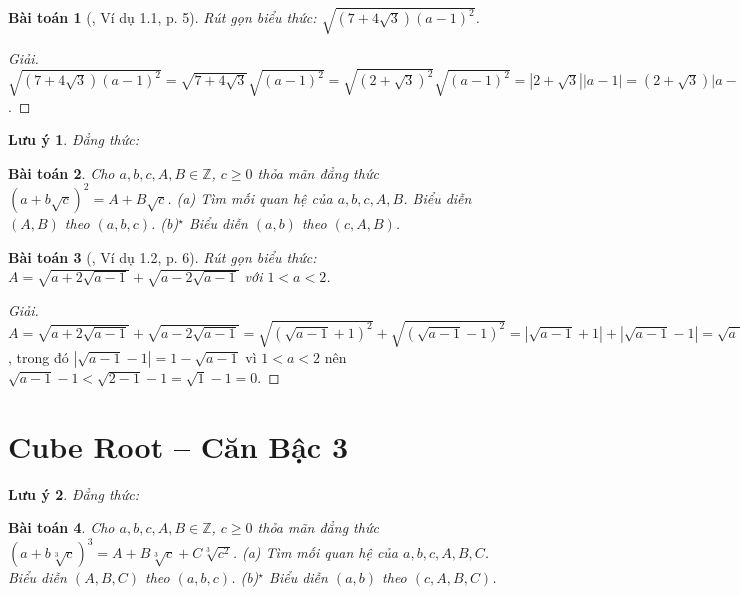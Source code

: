 \documentclass{article}
\newtheorem{baitoan}{Bài toán}
\newtheorem{luuy}{Lưu ý}
\begin{document}
\begin{baitoan}[\cite{TLCT_THCS_Toan_9_dai_so}, Ví dụ 1.1, p. 5]
	Rút gọn biểu thức: $\sqrt{(7 + 4\sqrt{3})(a - 1)^2}$.
\end{baitoan}

\begin{proof}[Giải]
	$\sqrt{(7 + 4\sqrt{3})(a - 1)^2} = \sqrt{7 + 4\sqrt{3}}\sqrt{(a - 1)^2} = \sqrt{(2 + \sqrt{3})^2}\sqrt{(a - 1)^2} = |2 + \sqrt{3}||a - 1| = (2 + \sqrt{3})|a - 1|$.
\end{proof}

\begin{luuy}
	Đẳng thức: 
\end{luuy}

\begin{baitoan}
	Cho $a,b,c,A,B\in\mathbb{Z}$, $c\ge0$ thỏa mãn đẳng thức $(a + b\sqrt{c})^2 = A + B\sqrt{c}$. (a) Tìm mối quan hệ của $a,b,c,A,B$. Biểu diễn $(A,B)$ theo $(a,b,c)$. (b)${}^\star$ Biểu diễn $(a,b)$ theo $(c,A,B)$.
\end{baitoan}

\begin{baitoan}[\cite{TLCT_THCS_Toan_9_dai_so}, Ví dụ 1.2, p. 6]
	Rút gọn biểu thức: $A = \sqrt{a + 2\sqrt{a - 1}} + \sqrt{a - 2\sqrt{a - 1}}$ với $1 < a < 2$.
\end{baitoan}

\begin{proof}[Giải]
	$A = \sqrt{a + 2\sqrt{a - 1}} + \sqrt{a - 2\sqrt{a - 1}} = \sqrt{(\sqrt{a - 1} + 1)^2} + \sqrt{(\sqrt{a - 1} - 1)^2} = |\sqrt{a - 1} + 1| + |\sqrt{a - 1} - 1| = \sqrt{a - 1} + 1 + + 1 - \sqrt{a - 1} = 2$, trong đó $|\sqrt{a - 1} - 1| = 1 - \sqrt{a - 1}$ vì $1 < a < 2$ nên $\sqrt{a - 1} - 1 < \sqrt{2 - 1} - 1 = \sqrt{1} - 1 = 0$.
\end{proof}



\section{Cube Root -- Căn Bậc 3}

\begin{luuy}
	Đẳng thức: 
\end{luuy}

\begin{baitoan}
	Cho $a,b,c,A,B\in\mathbb{Z}$, $c\ge0$ thỏa mãn đẳng thức $(a + b\sqrt[3]{c})^3 = A + B\sqrt[3]{c} + C\sqrt[3]{c^2}$. (a) Tìm mối quan hệ của $a,b,c,A,B,C$. Biểu diễn $(A,B,C)$ theo $(a,b,c)$. (b)${}^\star$ Biểu diễn $(a,b)$ theo $(c,A,B,C)$.
\end{baitoan}


\printbibliography[heading=bibintoc]
	
\end{document}
